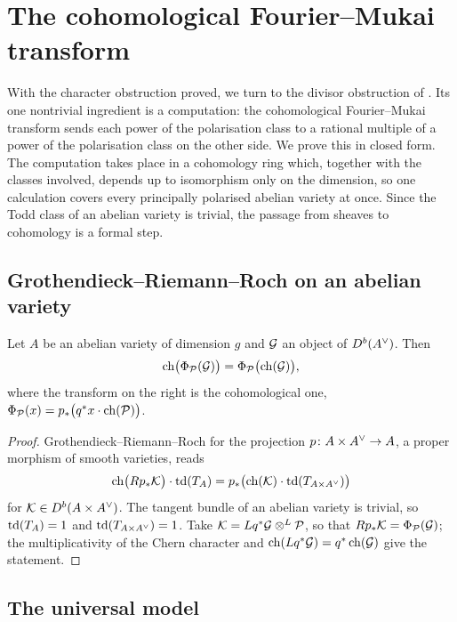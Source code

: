 \section{The cohomological Fourier--Mukai transform}\label{sec:fm}

With the character obstruction proved, we turn to the divisor obstruction of
. Its one nontrivial ingredient is a computation: the
cohomological Fourier--Mukai transform sends each power of the polarisation
class to a rational multiple of a power of the polarisation class on the
other side. We prove this in closed form. The computation takes place in a
cohomology ring which, together with the classes involved, depends up to
isomorphism only on the dimension, so one calculation covers every
principally polarised abelian variety at once. Since the Todd class of an
abelian variety is trivial, the passage from sheaves to cohomology is a
formal step.

\subsection{Grothendieck--Riemann--Roch on an abelian variety}

\begin{proposition}\label{prop:grr}
Let $A$ be an abelian variety of dimension $g$ and $\mathcal{G}$ an object of
$D^{b}(A^{\vee})$. Then
\[
  \operatorname{ch}\bigl(\Phi_{\mathcal{P}}(\mathcal{G})\bigr)=\Phi_{\mathcal{P}}\bigl(\operatorname{ch}(\mathcal{G})\bigr),
\]
where the transform on the right is the cohomological one,
$\Phi_{\mathcal{P}}(x)=p_{*}\bigl(q^{*}x\cdot\operatorname{ch}(\mathcal{P})\bigr)$.
\end{proposition}

\begin{proof}
Grothendieck--Riemann--Roch for the projection
$p\colon A\times A^{\vee}\to A$, a proper morphism of smooth varieties, reads
\[
  \operatorname{ch}\bigl(Rp_{*}\mathcal{K}\bigr)\cdot\operatorname{td}(T_{A})
  =p_{*}\bigl(\operatorname{ch}(\mathcal{K})\cdot\operatorname{td}(T_{A\times A^{\vee}})\bigr)
\]
for $\mathcal{K}\in D^{b}(A\times A^{\vee})$. The tangent bundle of an abelian variety is
trivial, so $\operatorname{td}(T_{A})=1$ and $\operatorname{td}(T_{A\times A^{\vee}})=1$. Take
$\mathcal{K}=Lq^{*}\mathcal{G}\otimes^{L}\mathcal{P}$, so that $Rp_{*}\mathcal{K}=\Phi_{\mathcal{P}}(\mathcal{G})$; the
multiplicativity of the Chern character and $\operatorname{ch}(Lq^{*}\mathcal{G})=q^{*}\operatorname{ch}(\mathcal{G})$
give the statement.
\end{proof}

\subsection{The universal model}

